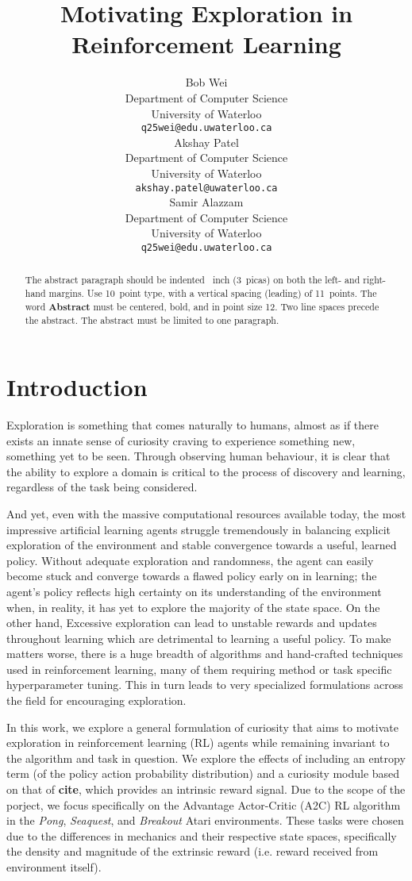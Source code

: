 \documentclass{article}
\title{Motivating Exploration in Reinforcement Learning}
\author{
  Bob Wei\\
  Department of Computer Science\\
  University of Waterloo\\
  \texttt{q25wei@edu.uwaterloo.ca} \\
  \And
  Akshay Patel \\
  Department of Computer Science\\
  University of Waterloo\\
  \texttt{akshay.patel@uwaterloo.ca} \\
  \AND
  Samir Alazzam \\
  Department of Computer Science\\
  University of Waterloo\\
  \texttt{q25wei@edu.uwaterloo.ca} \\
}
\begin{document}
\maketitle

\begin{abstract}
  The abstract paragraph should be indented ~inch (3~picas) on
  both the left- and right-hand margins. Use 10~point type, with a vertical
  spacing (leading) of 11~points.  The word \textbf{Abstract} must be centered,
  bold, and in point size 12. Two line spaces precede the abstract. The abstract
  must be limited to one paragraph.
\end{abstract}

\section{Introduction}

Exploration is something that comes naturally to humans, almost as if there exists an innate sense of curiosity craving to experience something new, something yet to be seen. Through observing human behaviour, it is clear that the ability to explore a domain is critical to the process of discovery and learning, regardless of the task being considered.

And yet, even with the massive computational resources available today, the most impressive artificial learning agents struggle tremendously in balancing explicit exploration of the environment and stable convergence towards a useful, learned policy. Without adequate exploration and randomness, the agent can easily become stuck and converge towards a flawed policy early on in learning; the agent's policy reflects high certainty on its understanding of the environment when, in reality, it has yet to explore the majority of the state space. On the other hand, Excessive exploration can lead to unstable rewards and updates throughout learning which are detrimental to learning a useful policy. To make matters worse, there is a huge breadth of algorithms and hand-crafted techniques used in reinforcement learning, many of them requiring method or task specific hyperparameter tuning. This in turn leads to very specialized formulations across the field for encouraging exploration.

In this work, we explore a general formulation of curiosity that aims to motivate exploration in reinforcement learning (RL) agents while remaining invariant to the algorithm and task in question. We explore the effects of including an entropy term (of the policy action probability distribution) and a curiosity module based on that of \textbf{cite}, which provides an intrinsic reward signal. Due to the scope of the porject, we focus specifically on the Advantage Actor-Critic (A2C) RL algorithm in the \textit{Pong}, \textit{Seaquest}, and \textit{Breakout} Atari environments. These tasks were chosen due to the differences in mechanics and their respective state spaces, specifically the density and magnitude of the extrinsic reward (i.e. reward received from environment itself).
\end{document}
